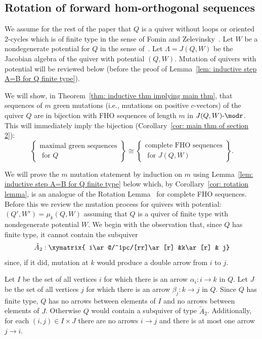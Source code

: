 \subsection{Rotation of forward hom-orthogonal sequences} 


We assume for the rest of the paper that $Q$ is a quiver without loops or oriented 2-cycles which is of finite type in the sense of Fomin and Zelevinsky~\cite{FZ4}. Let $W$ be a nondegenerate potential for $Q$ in the sense of~\cite{DWZ1}. Let $\Lambda=J(Q,W)$ be the Jacobian algebra of the quiver with potential $(Q,W)$. Mutation of quivers with potential will be reviewed below (before the proof of Lemma~\ref{lem: inductive step A=B for Q finite type}).

We will show, in Theorem~\ref{thm: inductive thm implying main thm}, that sequences of $m$ green mutations (i.e., mutations on positive $c$-vectors) of the quiver $Q$ are in bijection with FHO sequences of length $m$ in $J(Q,W)\text{-}\modr $. This will immediately imply the bijection (Corollary~\ref{cor: main thm of section 2}):
\[
	\left\{\begin{array}{cc}
	\text{maximal green sequences}\\
	\text{ for $Q$}
	\end{array}
	\right\}
\cong 
	\left\{\begin{array}{cc}
	\text{complete FHO sequences}\\
	\text{ for $J(Q,W)$}
	\end{array}
	\right\}.
\]



We will prove the $m$ mutation statement by induction on $m$ using Lemma~\ref{lem: inductive step A=B for Q finite type} below which, by Corollary~\ref{cor: rotation lemma}, is an analogue of the Rotation Lemma~\cite{BHIT} for complete FHO sequences. Before this we review the mutation process for quivers with potential: $(Q',W')=\mu_k(Q,W)$ assuming that $Q$ is a quiver of finite type with nondegenerate potential $W$. We begin with the observation that, since $Q$ has finite type, it cannot contain the subquiver 
\[
	\tilde A_2:\xymatrix{ i\ar@/^1pc/[rr]\ar[r] &k\ar[r] & j}
\]
since, if it did, mutation at $k$ would produce a double arrow from $i$ to $j$.


Let $I$ be the set of all vertices $i$ for which there is an arrow $\alpha_i:i\to k$ in $Q$. Let $J$ be the set of all vertices $j$ for which there is an arrow $\beta_j:k\to j$ in $Q$. Since $Q$ has finite type, $Q$ has no arrows between elements of $I$ and no arrows between elements of $J$. Otherwise $Q$ would contain a subquiver of type $\tilde A_2$. Additionally, for each $(i, j) \in  I \times J$ there are no arrows $i \rightarrow j$ and there is at most one arrow $j \rightarrow i$.



